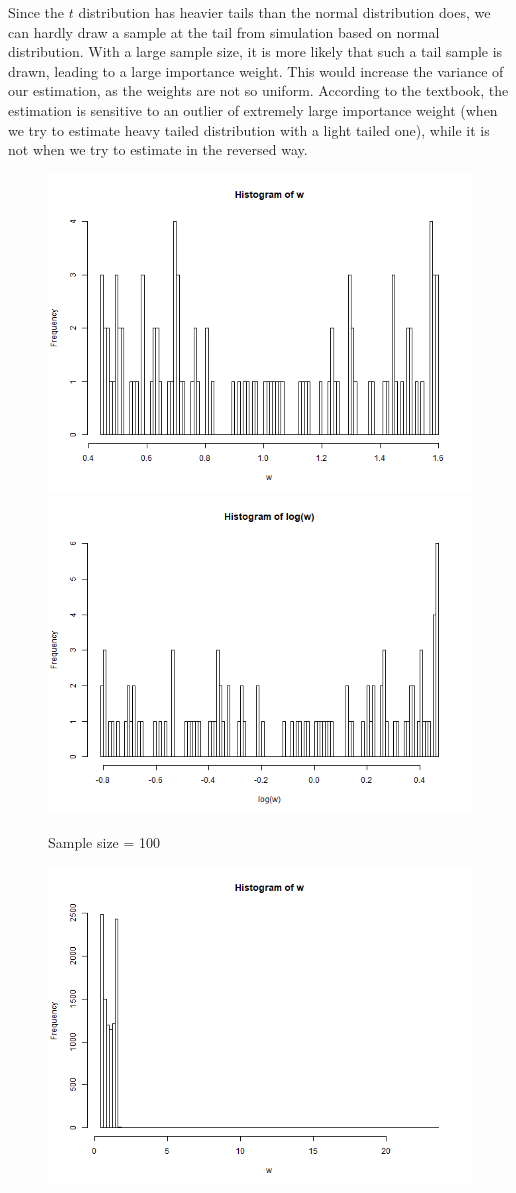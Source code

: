 \documentclass{article}
\begin{document}
{    Since the $t$ distribution has heavier tails than the normal distribution does, we can hardly draw a sample at the tail from simulation based on normal distribution. With a large sample size, it is more likely that such a tail sample is drawn, leading to a large importance weight. This would increase the variance of our estimation, as the weights are not so uniform. According to the textbook, the estimation is sensitive to an outlier of extremely large importance weight (when we try to estimate heavy tailed distribution with a light tailed one), while it is not when we try to estimate in the reversed way.
    \begin{figure}[H]
        \centering
        \includegraphics[width = 0.6\linewidth]{2_weight_100.png}
        \includegraphics[width = 0.6\linewidth]{2_log_weight_100.png}
        \caption{Sample size = 100}
    \end{figure}
    \begin{figure}[H]
        \centering
        \includegraphics[width = 0.6\linewidth]{2_weight_10000.png}

\end{figure}}
\end{document}
